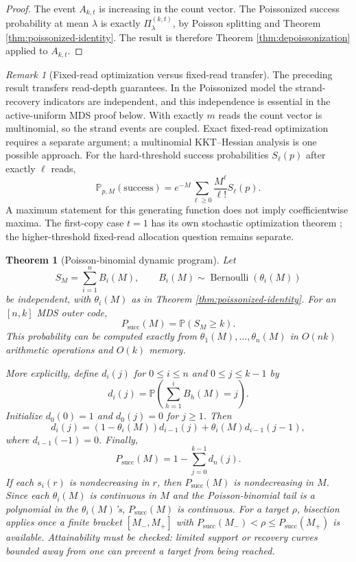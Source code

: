 \documentclass[11pt]{article}
\newtheorem{theorem}{Theorem}
\theoremstyle{definition}
\theoremstyle{remark}
\newtheorem{remark}{Remark}
\DeclareMathOperator{\Bernoulli}{Bernoulli}
\newcommand{\Pbb}{\mathbb P}
\newcommand{\1}{\mathbf 1}
\begin{document}
\begin{proof}
The event \(A_{k,t}\) is increasing in the count vector.  The Poissonized success probability at mean \(\lambda\) is exactly \(\Pi_\lambda^{(k,t)}\), by Poisson splitting and Theorem \ref{thm:poissonized-identity}.  The result is therefore Theorem \ref{thm:depoissonization} applied to \(A_{k,t}\).
\end{proof}


\begin{remark}[Fixed-read optimization versus fixed-read transfer]
The preceding result transfers read-depth guarantees. In the Poissonized model the strand-recovery indicators are independent, and this independence is essential in the active-uniform MDS proof below. With exactly \(m\) reads the count vector is multinomial, so the strand events are coupled. Exact fixed-read optimization requires a separate argument; a multinomial KKT--Hessian analysis is one possible approach. For the hard-threshold success probabilities \(S_\ell(p)\) after exactly \(\ell\) reads,
\[
 \Pbb_{p,M}(\mathrm{success})
 =e^{-M}\sum_{\ell\ge0}\frac{M^\ell}{\ell!}S_\ell(p).
\]
A maximum statement for this generating function does not imply coefficientwise maxima. The first-copy case \(t=1\) has its own stochastic optimization theorem \cite{Anceaume2015}; the higher-threshold fixed-read allocation question remains separate.
\end{remark}

\begin{theorem}[Poisson-binomial dynamic program]\label{thm:dp}
Let
\[
  S_M=\sum_{i=1}^n B_i(M),
  \qquad B_i(M)\sim\Bernoulli(\theta_i(M))
\]
be independent, with \(\theta_i(M)\) as in Theorem \ref{thm:poissonized-identity}.  For an \([n,k]\) MDS outer code,
\[
  P_{\mathrm{succ}}(M)=\Pbb(S_M\ge k).
\]
This probability can be computed exactly from \(\theta_1(M),\ldots,\theta_n(M)\) in \(O(nk)\) arithmetic operations and \(O(k)\) memory.

More explicitly, define \(d_i(j)\) for \(0\le i\le n\) and \(0\le j\le k-1\) by
\[
  d_i(j)=\Pbb\left(\sum_{h=1}^i B_h(M)=j\right).
\]
Initialize \(d_0(0)=1\) and \(d_0(j)=0\) for \(j\ge1\).  Then
\[
  d_i(j)=(1-\theta_i(M))d_{i-1}(j)+\theta_i(M)d_{i-1}(j-1),
\]
where \(d_{i-1}(-1)=0\).  Finally,
\[
  P_{\mathrm{succ}}(M)=1-\sum_{j=0}^{k-1}d_n(j).
\]
If each \(s_i(r)\) is nondecreasing in \(r\), then \(P_{\mathrm{succ}}(M)\) is nondecreasing in \(M\). Since each \(\theta_i(M)\) is continuous in \(M\) and the Poisson-binomial tail is a polynomial in the \(\theta_i(M)\)'s, \(P_{\mathrm{succ}}(M)\) is continuous. For a target \(\rho\), bisection applies once a finite bracket \([M_-,M_+]\) with \(P_{\mathrm{succ}}(M_-)<\rho\le P_{\mathrm{succ}}(M_+)\) is available. Attainability must be checked: limited support or recovery curves bounded away from one can prevent a target from being reached.
\end{theorem}
\end{document}
